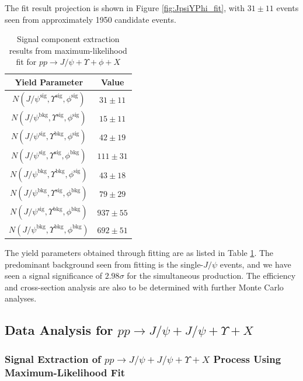 \documentclass[10pt,twocolumn]{article}
\begin{document}
The fit result projection is shown in Figure  \ref{fig:JpsiYPhi_fit}, with $31 \pm 11$ events seen from approximately 1950 candidate events.

\begin{table}[]
    \centering
    \caption{Signal component extraction results from maximum-likelihood fit for $pp\to J/\psi+\Upsilon+\phi+X$\\}
    \begin{tabular}{cc}
        \toprule
        \textbf{Yield Parameter} & \textbf{Value} \\
        \midrule
        $N(J/\psi^{\text{sig}  },\Upsilon^{\text{sig} }, \phi^\text{sig})$ & $31 \pm 11$ \\
        $N(J/\psi^{\text{bkg}  },\Upsilon^{\text{sig} }, \phi^\text{sig})$ & $15 \pm 11$ \\
        $N(J/\psi^{\text{sig}  },\Upsilon^{\text{bkg} }, \phi^\text{sig})$ & $42 \pm 19$ \\
        $N(J/\psi^{\text{sig}  },\Upsilon^{\text{sig} }, \phi^\text{bkg})$ & $111 \pm 31$ \\
        $N(J/\psi^{\text{bkg}  },\Upsilon^{\text{bkg} }, \phi^\text{sig})$ & $43 \pm 18$ \\
        $N(J/\psi^{\text{bkg}  },\Upsilon^{\text{sig} }, \phi^\text{bkg})$ & $79 \pm 29$ \\
        $N(J/\psi^{\text{sig}  },\Upsilon^{\text{bkg} }, \phi^\text{bkg})$ & $937 \pm 55$ \\
        $N(J/\psi^{\text{bkg}  },\Upsilon^{\text{bkg} }, \phi^\text{bkg})$ & $692 \pm 51$ \\
        \bottomrule
    \end{tabular}
    \label{tab:fitres_JpsiYPhi}
\end{table}

The yield parameters obtained through fitting are as listed in Table \ref{tab:fitres_JpsiYPhi}. The predominant background seen from fitting is the single-$J/\psi$ events, and we have seen a signal significance of $2.98 \sigma$ for the simultaneous production. The efficiency and cross-section analysis are also to be determined with further Monte Carlo analyses.

\subsection{Data Analysis for $pp\to J/\psi+J/\psi+\Upsilon+X$}

\subsubsection{Signal Extraction of $pp\to J/\psi+J/\psi+\Upsilon+X$ Process Using Maximum-Likelihood Fit}
\end{document}
